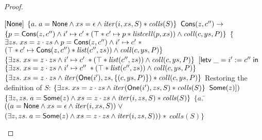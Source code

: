 \begin{proof}
\begin{itemize}
\begin{specification}
\nextline \> \> $[\mathsf{None}]$ 
\nextline \> \> $\{{a.\; a = \mathsf{None} \land xs = \epsilon \land \mathit{iter}(i, xs, S) * \mathit{colls}(S)}\}$
\nextline \> $\mathsf{Cons}(z, c'') \to$ 
\nextline \> \> $\{{p = \mathsf{Cons}(z, c'') \land i' \mapsto c' * (\top * c' \mapsto p * \mathit{listcell}(p, xs)) \land \mathit{coll}(c, ys, P)}\}$
\nextline \> \> $\{$\=$\exists zs.\; xs = z\cdot zs \land p = \mathsf{Cons}(z, c'') \land i' \mapsto c' \;*$ 
\nextline \> \>     \>$(\top * c' \mapsto \mathsf{Cons}(z, c'') * \mathit{list}(c'', zs)) \land \mathit{coll}(c, ys, P)\}$
\nextline \> \> $\{{\exists zs.\; xs = z\cdot zs \land i' \mapsto c' \;*
                       (\top * \mathit{list}(c'', zs)) \land \mathit{coll}(c, ys, P)}\}$
\nextline \> \> $[\mathsf{letv}\;\_ = i' := c''\;\mathsf{in}\;$ 
\nextline \> \> $\{{\exists zs.\; xs = z\cdot zs \land i' \mapsto c'' \;*
                       (\top * \mathit{list}(c'', zs)) \land \mathit{coll}(c, ys, P)}\}$
\nextline \> \> $\{{\exists zs.\; xs = z\cdot zs \land
                        \mathit{iter}(\mathsf{One}(i'), zs, \{{(c, ys, P)}\}) * \mathit{coll}(c, ys, P)}\}$ 
\nextline \> \> Restoring the definition of $S$:
\nextline \> \> $\{{\exists zs.\; xs = z\cdot zs \land
                        \mathit{iter}(\mathsf{One}(i'), zs, S) * \mathit{colls}(S)}\}$ 
\nextline \> \> $\mathsf{Some}(z)])$ 
\nextline \> \> $\{{\exists z, zs.\; a = \mathsf{Some}(z) \land xs = z\cdot zs \land
                        \mathit{iter}(i, zs, S) * \mathit{colls}(S)}\}$ 
\nextline $\{a.\;$\=$((a = \mathsf{None} \land xs = \epsilon \land \mathit{iter}(i, xs, S)) \; \vee$ 
\nextline         \>$(\exists z, zs.\; a = \mathsf{Some}(z) \land xs = z\cdot zs \land \mathit{iter}(i, zs, S))) \;*$ 
\nextline         \>$\mathit{colls}(S)\}$
\end{specification}


\end{itemize}
\end{proof}
